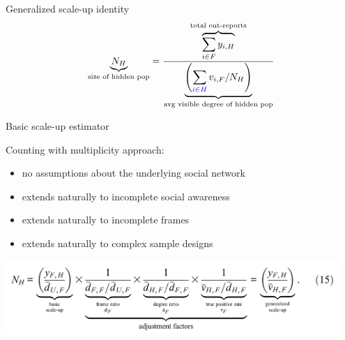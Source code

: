 \documentclass[aspectratio=169]{beamer}
\begin{document}
\begin{frame}

Generalized scale-up identity
\begin{equation*}
\underbrace{N_H}_{\text{size of hidden pop}} = \frac{ \overbrace{ \sum_{i \in F} y_{i,H} }^{\text{total out-reports}} } { \underbrace{ \left( \sum_{\textcolor{blue}{i \in H}} v_{i,F} / N_H \right) }_{\text{avg visible degree of hidden pop}} }
\end{equation*}

\vfill
Basic scale-up estimator


\end{frame}
\begin{frame}

Counting with multiplicity approach:
\begin{itemize}
\item no assumptions about the underlying social network
\item extends naturally to incomplete social awareness
\item extends naturally to incomplete frames
\item extends naturally to complex sample designs
\end{itemize}

\end{frame}
\begin{frame}

\begin{center}
\includegraphics[width=0.95\textwidth]{figures/feehan_generalizing_2016_eq15}
\end{center}

\end{frame}
\end{document}
